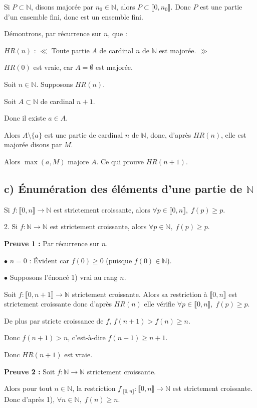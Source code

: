 \documentclass[a4paper,11pt]{article}
\newcommand{\N}{\mathbb{N}}
\begin{document}
\begin{demonstration}
    Si $P \subset \N$, disons majorée par $n_0 \in \N$, alors $P \subset \llbracket 0, n_0 \rrbracket$. Donc $P$ est une partie d'un ensemble fini, donc est un ensemble fini.
    
    Démontrons, par récurrence sur $n$, que :
    \begin{center}
        $HR(n)$ : $\ll$ Toute partie $A$ de cardinal $n$ de $\N$ est majorée. $\gg$
    \end{center}
    
    $HR(0)$ est vraie, car $A = \emptyset$ est majorée.
    
    Soit $n \in \N$. Supposons $HR(n)$.
    
    Soit $A \subset \N$ de cardinal $n+1$.
    
    Donc il existe $a \in A$.
    
    Alors $A \setminus \{a\}$ est une partie de cardinal $n$ de $\N$, donc, d'après $HR(n)$, elle est majorée disons par $M$.
    
    Alors $\max(a, M)$ majore $A$. Ce qui prouve $HR(n+1)$.
\end{demonstration}

\subsection*{c) Énumération des éléments d'une partie de $\N$}

\begin{lemme}[1]
    Si $f : \llbracket 0, n \rrbracket \to \N$ est strictement croissante, alors $\forall p \in \llbracket 0, n \rrbracket, \; f(p) \ge p$.
    
    2. Si $f : \N \to \N$ est strictement croissante, alors $\forall p \in \N, \; f(p) \ge p$.
\end{lemme}

\begin{demonstration}
    \textbf{Preuve 1 :} Par récurrence sur $n$.
    
    $\bullet$ $n=0$ : Évident car $f(0) \ge 0$ (puisque $f(0) \in \N$).
    
    $\bullet$ Supposons l'énoncé 1) vrai au rang $n$.
    
    Soit $f : \llbracket 0, n+1 \rrbracket \to \N$ strictement croissante. Alors sa restriction à $\llbracket 0, n \rrbracket$ est strictement croissante donc d'après $HR(n)$ elle vérifie $\forall p \in \llbracket 0, n \rrbracket, \; f(p) \ge p$.
    
    De plus par stricte croissance de $f$, $f(n+1) > f(n) \ge n$.
    
    Donc $f(n+1) > n$, c'est-à-dire $f(n+1) \ge n+1$.
    
    Donc $HR(n+1)$ est vraie.
    
    \vspace{10pt}
    \textbf{Preuve 2 :} Soit $f : \N \to \N$ strictement croissante.
    
    Alors pour tout $n \in \N$, la restriction $f_{| \llbracket 0, n \rrbracket} : \llbracket 0, n \rrbracket \to \N$ est strictement croissante. 
    Donc d'après 1), $\forall n \in \N, \; f(n) \ge n$.
\end{demonstration}
\end{document}
